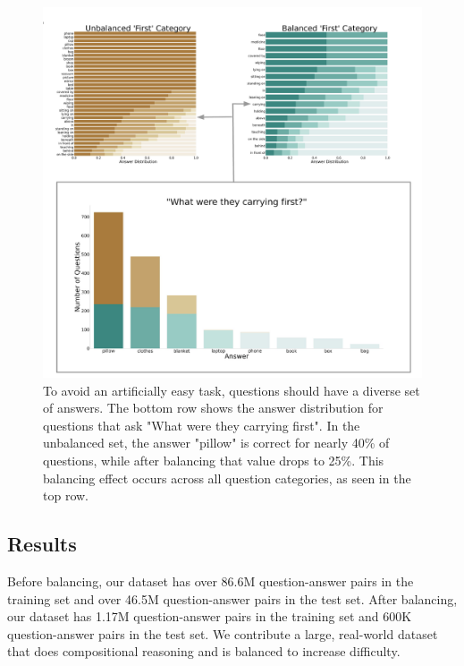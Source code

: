 \begin{figure}[t]
    \centering
    \includegraphics[width=0.95\linewidth]{figures/balance first.pdf}
    \caption{To avoid an artificially easy task, questions should have a diverse set of answers. The bottom row shows the answer distribution for questions that ask "What were they carrying first". In the unbalanced set, the answer "pillow" is correct for nearly 40\% of questions, while after balancing that value drops to 25\%. This balancing effect occurs across all question categories, as seen in the top row.}
    \label{fig:balancefirst}
\end{figure}



\subsection{Results}
Before balancing, our dataset has over 86.6M question-answer pairs in the training set and over 46.5M question-answer pairs in the test set. After balancing, our dataset has 1.17M question-answer pairs in the training set and 600K question-answer pairs in the test set. We contribute a large, real-world dataset that does compositional reasoning and is balanced to increase difficulty. 

